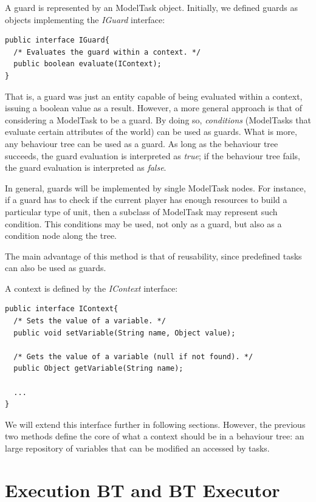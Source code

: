 \documentclass[a4paper,10pt]{article}
\begin{document}
A guard is represented by an ModelTask object. Initially, we defined guards as objects implementing the \textit{IGuard} interface:

\begin{verbatim}
public interface IGuard{
  /* Evaluates the guard within a context. */
  public boolean evaluate(IContext);
}
\end{verbatim}

That is, a guard was just an entity capable of being evaluated within a context, issuing a boolean value as a result. However, a more general approach is that of considering a ModelTask to be a guard. By doing so, \textit{conditions} (ModelTasks that evaluate certain attributes of the world) can be used as guards. What is more, any behaviour tree can be used as a guard. As long as the behaviour tree succeeds, the guard evaluation is interpreted as \textit{true}; if the behaviour tree fails, the guard evaluation is interpreted as \textit{false}.

In general, guards will be implemented by single ModelTask nodes. For instance, if a guard has to check if the current player has enough resources to build a particular type of unit, then a subclass of ModelTask may represent such condition. This conditions may be used, not only as a guard, but also as a condition node along the tree.

The main advantage of this method is that of reusability, since predefined tasks can also be used as guards.

A context is defined by the \textit{IContext} interface:

\begin{verbatim}
public interface IContext{
  /* Sets the value of a variable. */
  public void setVariable(String name, Object value);

  /* Gets the value of a variable (null if not found). */
  public Object getVariable(String name);

  ...
}
\end{verbatim}

We will extend this interface further in following sections. However, the previous two methods define the core of what a context should be in a behaviour tree: an large repository of variables that can be modified an accessed by tasks.

\section{Execution BT and BT Executor}\label{Sub:ExecutionBTAndBTExecutor}
\end{document}
